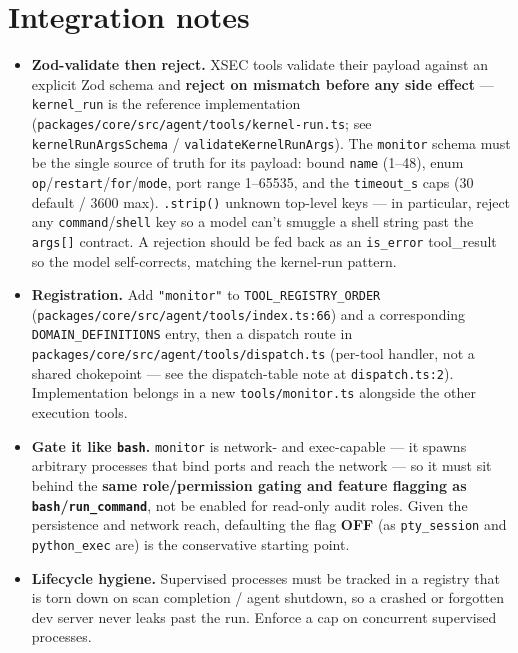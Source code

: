 \documentclass[11pt]{article}
\begin{document}
\section{Integration notes}

\begin{itemize}[leftmargin=*]
  \item \textbf{Zod-validate then reject.} XSEC tools validate their payload
  against an explicit Zod schema and \textbf{reject on mismatch before any side
  effect} --- \texttt{kernel\_run} is the reference implementation
  (\texttt{packages/core/src/agent/tools/kernel-run.ts}; see
  \texttt{kernelRunArgsSchema} / \texttt{validateKernelRunArgs}). The
  \texttt{monitor} schema must be the single source of truth for its payload:
  bound \texttt{name} (1--48), enum \texttt{op}/\texttt{restart}/\texttt{for}/\texttt{mode},
  port range 1--65535, and the \texttt{timeout\_s} caps (30 default / 3600 max).
  \texttt{.strip()} unknown top-level keys --- in particular, reject any
  \texttt{command}/\texttt{shell} key so a model can't smuggle a shell string past
  the \texttt{args[]} contract. A rejection should be fed back as an
  \texttt{is\_error} tool\_result so the model self-corrects, matching the
  kernel-run pattern.
  \item \textbf{Registration.} Add \texttt{"monitor"} to
  \texttt{TOOL\_REGISTRY\_ORDER} (\texttt{packages/core/src/agent/tools/index.ts:66})
  and a corresponding \texttt{DOMAIN\_DEFINITIONS} entry, then a dispatch route in
  \texttt{packages/core/src/agent/tools/dispatch.ts} (per-tool handler, not a
  shared chokepoint --- see the dispatch-table note at \texttt{dispatch.ts:2}).
  Implementation belongs in a new \texttt{tools/monitor.ts} alongside the other
  execution tools.
  \item \textbf{Gate it like \texttt{bash}.} \texttt{monitor} is network- and
  exec-capable --- it spawns arbitrary processes that bind ports and reach the
  network --- so it must sit behind the \textbf{same role/permission gating and
  feature flagging as \texttt{bash}/\texttt{run\_command}}, not be enabled for
  read-only audit roles. Given the persistence and network reach, defaulting the
  flag \textbf{OFF} (as \texttt{pty\_session} and \texttt{python\_exec} are) is the
  conservative starting point.
  \item \textbf{Lifecycle hygiene.} Supervised processes must be tracked in a
  registry that is torn down on scan completion / agent shutdown, so a crashed or
  forgotten dev server never leaks past the run. Enforce a cap on concurrent
  supervised processes.
\end{itemize}
\end{document}
